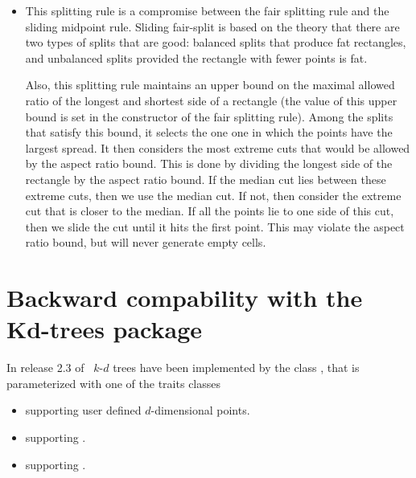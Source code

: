\begin{itemize}
\item {}

This splitting rule is a compromise between the fair splitting rule
and the sliding midpoint rule.  Sliding fair-split is based on the
theory that there are two types of splits that are good: balanced
splits that produce fat rectangles, and unbalanced splits provided the
rectangle with fewer points is fat.

Also, this splitting rule maintains an upper bound on the maximal
allowed ratio of the longest and shortest side of a rectangle (the
value of this upper bound is set in the constructor of the fair
splitting rule). Among the splits that satisfy this bound, it selects
the one one in which the points have the largest spread.  It then
considers the most extreme cuts that would be allowed by the aspect
ratio bound. This is done by dividing the longest side of the
rectangle by the aspect ratio bound. If the median cut lies between
these extreme cuts, then we use the median cut. If not, then consider
the extreme cut that is closer to the median.  If all the points lie
to one side of this cut, then we slide the cut until it hits the first
point.  This may violate the aspect ratio bound, but will never
generate empty cells.

\end{itemize}



\section{Backward compability with the Kd-trees package}
\label{Spatial_searching:Backward_compability_Kd-trees}

In release 2.3 of \cgal\ $k$-$d$ trees have been implemented by the
class , that is parameterized with
one of the traits classes

\begin{itemize}

\item
{} supporting user defined $d$-dimensional points.

\item 
{} supporting . 

\item
{} supporting . 

\end{itemize}

